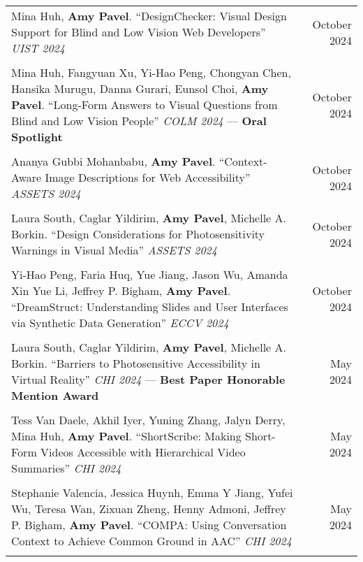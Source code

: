 \begin{longtable}{Xr}
	Mina Huh, \textbf{Amy Pavel}. ``DesignChecker: Visual Design Support for Blind and Low Vision Web Developers'' \textit{UIST 2024} & October 2024 \\
	\\

	Mina Huh, Fangyuan Xu, Yi-Hao Peng, Chongyan Chen, Hansika Murugu, Danna Gurari, Eunsol Choi, \textbf{Amy Pavel}. ``Long-Form Answers to Visual Questions from Blind and Low Vision People'' \textit{COLM 2024} --- \textbf{Oral Spotlight} & October 2024 \\
	\\

	Ananya Gubbi Mohanbabu, \textbf{Amy Pavel}. ``Context-Aware Image Descriptions for Web Accessibility'' \textit{ASSETS 2024} & October 2024 \\
	\\

	Laura South, Caglar Yildirim, \textbf{Amy Pavel}, Michelle A. Borkin. ``Design Considerations for Photosensitivity Warnings in Visual Media'' \textit{ASSETS 2024} & October 2024 \\
	\\

	Yi-Hao Peng, Faria Huq, Yue Jiang, Jason Wu, Amanda Xin Yue Li, Jeffrey P. Bigham, \textbf{Amy Pavel}. ``DreamStruct: Understanding Slides and User Interfaces via Synthetic Data Generation'' \textit{ECCV 2024} & October 2024 \\
	\\

	Laura South, Caglar Yildirim, \textbf{Amy Pavel}, Michelle A. Borkin. ``Barriers to Photosensitive Accessibility in Virtual Reality'' \textit{CHI 2024} --- \textbf{Best Paper Honorable Mention Award} & May 2024 \\
	\\

	Tess Van Daele, Akhil Iyer, Yuning Zhang, Jalyn Derry, Mina Huh, \textbf{Amy Pavel}. ``ShortScribe: Making Short-Form Videos Accessible with Hierarchical Video Summaries'' \textit{CHI 2024} & May 2024 \\
	\\

	Stephanie Valencia, Jessica Huynh, Emma Y Jiang, Yufei Wu, Teresa Wan, Zixuan Zheng, Henny Admoni, Jeffrey P. Bigham, \textbf{Amy Pavel}. ``COMPA: Using Conversation Context to Achieve Common Ground in AAC'' \textit{CHI 2024} & May 2024 \\
	\\


\end{longtable}
